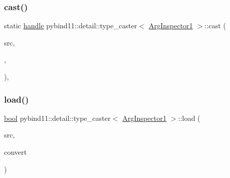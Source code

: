 \subsubsection{\texorpdfstring{cast()}{cast()}}
{\footnotesize\ttfamily static \mbox{\hyperlink{classhandle}{handle}} pybind11\+::detail\+::type\+\_\+caster$<$ \mbox{\hyperlink{class_arg_inspector1}{Arg\+Inspector1}} $>$\+::cast (\begin{DoxyParamCaption}\item[{const \mbox{\hyperlink{class_arg_inspector1}{Arg\+Inspector1}} \&}]{src,  }\item[{\mbox{\hyperlink{detail_2common_8h_adde72ab1fb0dd4b48a5232c349a53841}{return\+\_\+value\+\_\+policy}}}]{,  }\item[{\mbox{\hyperlink{classhandle}{handle}}}]{ }\end{DoxyParamCaption})\hspace{0.3cm}{\ttfamily [inline]}, {\ttfamily [static]}}

\mbox{\label{structpybind11_1_1detail_1_1type__caster_3_01_arg_inspector1_01_4_a2703a99a5253784be42822bd4d4fd9d6}} 
\subsubsection{\texorpdfstring{load()}{load()}}
{\footnotesize\ttfamily \mbox{\hyperlink{asdl_8h_af6a258d8f3ee5206d682d799316314b1}{bool}} pybind11\+::detail\+::type\+\_\+caster$<$ \mbox{\hyperlink{class_arg_inspector1}{Arg\+Inspector1}} $>$\+::load (\begin{DoxyParamCaption}\item[{\mbox{\hyperlink{classhandle}{handle}}}]{src,  }\item[{\mbox{\hyperlink{asdl_8h_af6a258d8f3ee5206d682d799316314b1}{bool}}}]{convert }\end{DoxyParamCaption})\hspace{0.3cm}{\ttfamily [inline]}}

\mbox{\label{structpybind11_1_1detail_1_1type__caster_3_01_arg_inspector1_01_4_ab87e460f3cd3440a73ec682f68b0853c}} 
